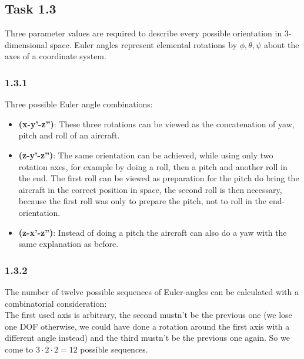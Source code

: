 \subsection*{Task 1.3}
Three parameter values are required to describe every possible orientation in 3-dimensional space.
Euler angles represent elemental rotations by $\phi,\theta,\psi$ about the axes of a coordinate system.\\

\subsubsection*{1.3.1}
Three possible Euler angle combinations:
\begin{itemize}
	\item \textbf{(x-y'-z'')}: These three rotations can be viewed as the concatenation of yaw, pitch and roll of an aircraft.
	\item \textbf{(z-y'-z'')}: The same orientation can be achieved, while using only two rotation axes, for example by doing a roll, then a pitch and another roll in the end. The first roll can be viewed as preparation for the pitch do bring the aircraft in the correct position in space, the second roll is then necessary, because the first roll was only to prepare the pitch, not to roll in the end-orientation.
	\item \textbf{(z-x'-z'')}: Instead of doing a pitch the aircraft can also do a yaw with the same explanation as before.
\end{itemize}

\subsubsection*{1.3.2}
The number of twelve possible sequences of Euler-angles can be calculated with a combinatorial consideration:\\
The first used axis is arbitrary, the second mustn't be the previous one (we lose one DOF otherwise, we could have done a rotation around the first axis with a different angle instead) and the third mustn't be the previous one again. So we come to $3\cdot 2\cdot 2 = 12$ possible sequences.